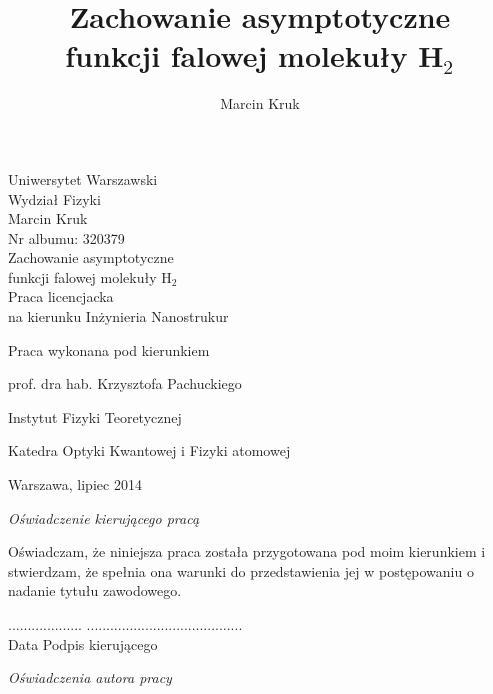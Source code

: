 \documentclass[a4paper,12pt]{article}
\title{Zachowanie asymptotyczne\\ funkcji falowej moleku\l y H$_2$}
\author{Marcin Kruk}
\date{}
\numberwithin{equation}{section}
\numberwithin{table}{section}
\numberwithin{figure}{section}
\begin{document}
%
%
\newpage
\thispagestyle{empty}
\vspace*{2cm}
\begin{center}
{\huge Uniwersytet Warszawski\\ \vspace{0.3cm}
Wydział Fizyki}\\
\vspace{1.5cm}
Marcin Kruk\\
Nr albumu: 320379\\
\vspace{1.5cm}
{\huge Zachowanie asymptotyczne\\ \vspace{0.3cm}funkcji falowej molekuły H${}_2$}\\

\vspace{2cm}
Praca licencjacka\\
na kierunku Inżynieria Nanostrukur\\
\end{center}
\vspace{3cm}
\hfill Praca wykonana pod kierunkiem \vspace{0.2cm}

 
\hfill prof. dra hab. Krzysztofa Pachuckiego

\hfill Instytut Fizyki Teoretycznej

\hfill Katedra Optyki Kwantowej i Fizyki atomowej
\vfill
\begin{center}
{\large Warszawa, lipiec 2014}\\
\end{center}
%
%
%
%
\newpage
\thispagestyle{empty}
\vspace*{2cm}
\noindent
\emph{Oświadczenie kierującego pracą}
\vspace{0.6cm}


\noindent Oświadczam, że niniejsza praca została przygotowana pod moim kierunkiem i stwierdzam, że spełnia ona warunki do przedstawienia jej w postępowaniu o nadanie tytułu zawodowego.
\vspace{1cm}

\noindent ................... \hfill ........................................\\
 Data \hfill Podpis kierującego
\vspace{3cm}

\noindent \emph{Oświadczenia autora pracy}
\vspace{0.6cm}
\end{document}
